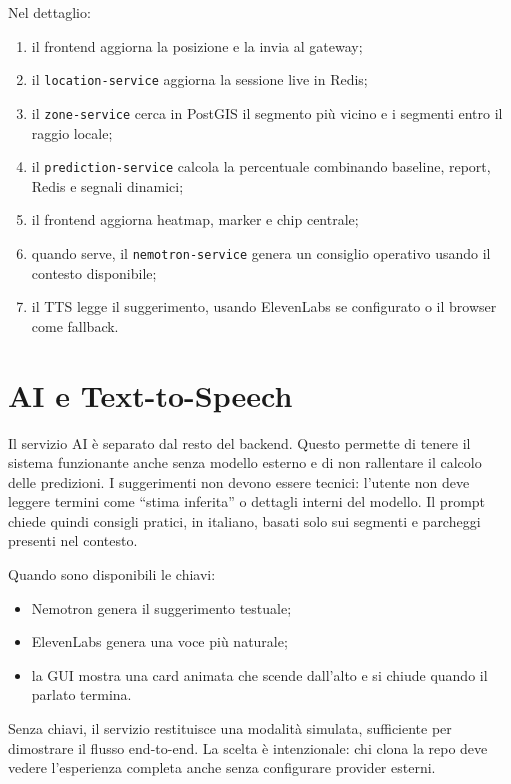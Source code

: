 \documentclass[11pt,a4paper]{article}
\newcommand{\service}[1]{\texttt{#1}}
\begin{document}
Nel dettaglio:

\begin{enumerate}
  \item il frontend aggiorna la posizione e la invia al gateway;
  \item il \service{location-service} aggiorna la sessione live in Redis;
  \item il \service{zone-service} cerca in PostGIS il segmento pi\`u vicino e i segmenti entro il raggio locale;
  \item il \service{prediction-service} calcola la percentuale combinando baseline, report, Redis e segnali dinamici;
  \item il frontend aggiorna heatmap, marker e chip centrale;
  \item quando serve, il \service{nemotron-service} genera un consiglio operativo usando il contesto disponibile;
  \item il TTS legge il suggerimento, usando ElevenLabs se configurato o il browser come fallback.
\end{enumerate}

\section{AI e Text-to-Speech}

Il servizio AI \`e separato dal resto del backend. Questo permette di tenere il sistema funzionante anche senza modello esterno e di non rallentare il calcolo delle predizioni. I suggerimenti non devono essere tecnici: l'utente non deve leggere termini come ``stima inferita'' o dettagli interni del modello. Il prompt chiede quindi consigli pratici, in italiano, basati solo sui segmenti e parcheggi presenti nel contesto.

Quando sono disponibili le chiavi:

\begin{itemize}
  \item Nemotron genera il suggerimento testuale;
  \item ElevenLabs genera una voce pi\`u naturale;
  \item la GUI mostra una card animata che scende dall'alto e si chiude quando il parlato termina.
\end{itemize}

Senza chiavi, il servizio restituisce una modalit\`a simulata, sufficiente per dimostrare il flusso end-to-end. La scelta \`e intenzionale: chi clona la repo deve vedere l'esperienza completa anche senza configurare provider esterni.
\end{document}
